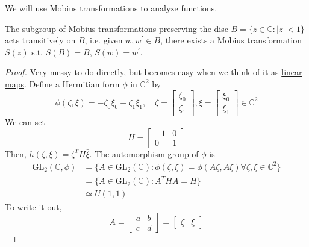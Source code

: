   We will use Mobius transformations to analyze functions. 

  \begin{theorem}
    \label{thm:mobius-transformations-preserving-the-unit-disc}
    The subgroup of Mobius transformations preserving the disc $B = \{z \in \mathbb{C} \colon |z| < 1\}$ acts transitively on $B$, i.e. given $w, w^\prime \in B$, there exists a Mobius transformation $S(z)$ s.t. $S(B) = B$, $S(w) = w^\prime$. 
  \end{theorem}
  \begin{proof}
    Very messy to do directly, but becomes easy when we think of it as \hyperref[lin-def:linear_map]{linear maps}. Define a Hermitian form $\phi$ in $\mathbb{C}^2$ by 
    \begin{equation}
      \phi(\zeta, \xi) = - \zeta_0 \bar{\xi}_0 + \zeta_1 \bar{\xi}_1, \quad \zeta = \begin{bmatrix} \zeta_0 \\ \zeta_1 \end{bmatrix}, \xi = \begin{bmatrix} \xi_0 \\ \xi_1 \end{bmatrix} \in \mathbb{C}^2
    \end{equation}
    We can set 
    \begin{equation}
      H = \begin{bmatrix} -1 & 0 \\ 0 & 1 \end{bmatrix} 
    \end{equation}
    Then, $h(\zeta, \xi) = \zeta^T H \bar{\xi}$. The automorphism group of $\phi$ is 
    \begin{align}
      \mathrm{GL}_2 (\mathbb{C}, \phi) & = \{ A \in \mathrm{GL}_2 (\mathbb{C}) \colon \phi(\zeta, \xi) = \phi(A \zeta, A \xi) \forall \zeta, \xi \in \mathbb{C}^2 \} \\ 
                                       & = \{A \in \mathrm{GL}_2 (\mathbb{C}) \colon A^T H \bar{A} = H \} \\ 
                                       & \simeq U(1, 1)
    \end{align}
    To write it out, 
    \begin{equation}
      A = \begin{bmatrix} a & b \\ c & d \end{bmatrix} = \begin{bmatrix} \zeta & \xi \end{bmatrix}

\end{equation}
\end{proof}
